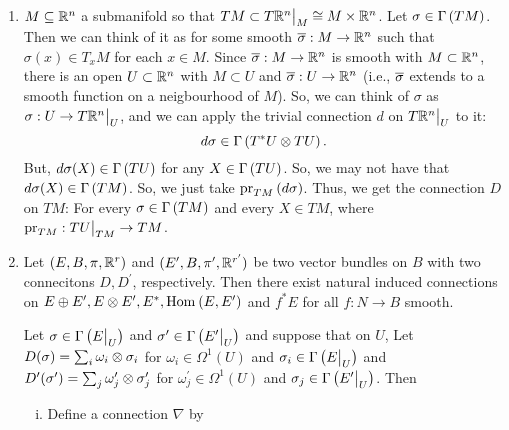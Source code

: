 \documentclass[main.tex]{subfiles}
\begin{document}
\begin{exmp}

    \begin{enumerate}
        \item $M \subseteq \mathbb{R}^n$ a submanifold so that $TM \subset T\mathbb{R}^n \big|_{M} \cong M \times \mathbb{R}^n$. Let $\sigma \in \Gamma\left( TM \right)$. Then we can think of it as
         for some smooth $\overline{\sigma} : M \to \mathbb{R}^n$ such that $\sigma(x) \in T_xM$ for each $x \in M$. Since $\overline{\sigma}: M \to \mathbb{R}^n$ is smooth with $M \subset \mathbb{R}^n$, there is an open $U \subset \mathbb{R}^n$ with $M \subset U$ and $\overline{\sigma} : U \to \mathbb{R}^n$ (i.e., $\overline{\sigma}$ extends to a smooth function on a neigbourhood of $M$). So, we can think of $\sigma$ as $\sigma: U \to T\mathbb{R}^n\big|_{U}$, and we can apply the trivial connection $d$ on $T\mathbb{R}^n\big|_{U}$ to it:
        \[
        d\sigma \in \Gamma\left( T^*U \otimes TU \right).
        \]
        But, $d\sigma(X) \in \Gamma\left( TU \right)$  for any $X \in \Gamma\left( TU \right)$. So, we may not have that $d\sigma(X) \in \Gamma\left( TM \right)$. So, we just take $\text{pr}_{TM}\left( d\sigma \right)$. Thus, we get the connection $D$ on $TM$: For every $\sigma \in \Gamma\left( TM \right)$ and every $X \in TM$,
        where $\text{pr}_{TM}: TU\big|_{TM} \to TM$.

        \item  Let $(E, B , \pi, \mathbb{R}^r)$ and $(E^\prime, B, \pi^\prime, \mathbb{R}^{r^\prime})$ be two vector bundles on $B$ with two connecitons $D, D^\prime$, respectively. Then there exist natural induced connections on $E \oplus E^\prime, E \otimes E^\prime, E^*, \text{Hom}_{}\left( E, E^\prime \right) $ and $f^*E$ for all $f: N\to B$ smooth.

        Let $\sigma \in \Gamma\left( E\big|_{U} \right)$ and $\sigma^\prime \in \Gamma\left( E^\prime\big|_{U} \right)$ and suppose that on $U$,
        Let $D(\sigma) = \sum_{i} \omega_i \otimes \sigma_i$ for $\omega_i \in \Omega^1(U)$ and $\sigma_i \in \Gamma\left( E\big|_{U} \right)$ and $D^\prime(\sigma^\prime) = \sum_j \omega_j^\prime \otimes \sigma_j^\prime$ for $\omega_j^\prime \in \Omega^1(U)$ and $\sigma_j \in \Gamma\left( E^\prime\big|_{U} \right) $. Then

        \begin{enumerate}[(i)]
            \item {} Define a connection $\nabla$ by


\end{enumerate}
\end{enumerate}
\end{exmp}
\end{document}
